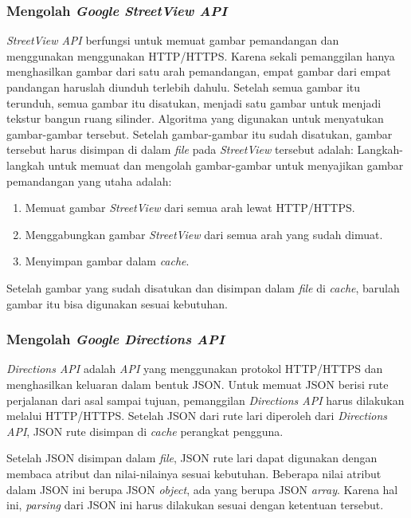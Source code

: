 \subsubsection{Mengolah \textit{Google StreetView API}} 
\textit{StreetView API} berfungsi untuk memuat gambar pemandangan dan menggunakan menggunakan HTTP/HTTPS. Karena sekali pemanggilan hanya menghasilkan gambar dari satu arah pemandangan, empat gambar dari empat pandangan haruslah diunduh terlebih dahulu. Setelah semua gambar itu terunduh, semua gambar itu disatukan, menjadi satu gambar untuk menjadi tekstur bangun ruang silinder. Algoritma yang digunakan untuk menyatukan gambar-gambar tersebut. Setelah gambar-gambar itu sudah disatukan, gambar tersebut harus disimpan di dalam \textit{file} pada \textit{StreetView} tersebut adalah: Langkah-langkah untuk memuat dan mengolah gambar-gambar untuk menyajikan gambar pemandangan yang utaha adalah:

	\begin{enumerate}
		\item Memuat gambar \textit{StreetView} dari semua arah lewat HTTP/HTTPS. 
		
		\item Menggabungkan gambar  \textit{StreetView} dari semua arah yang sudah dimuat.
		
		\item Menyimpan gambar dalam \textit{cache}.
	\end{enumerate}
	
Setelah gambar yang sudah disatukan dan disimpan dalam \textit{file} di \textit{cache}, barulah gambar itu bisa digunakan sesuai kebutuhan.


\subsubsection{Mengolah \textit{Google Directions API}}
\textit{Directions API} adalah \textit{API} yang menggunakan protokol HTTP/HTTPS dan menghasilkan keluaran dalam bentuk JSON. Untuk memuat JSON berisi rute perjalanan dari asal sampai tujuan, pemanggilan \textit{Directions API} harus dilakukan melalui HTTP/HTTPS. Setelah  JSON dari rute lari diperoleh dari \textit{Directions API}, JSON rute disimpan di \textit{cache} perangkat pengguna.

Setelah JSON disimpan dalam \textit{file}, JSON rute lari dapat digunakan dengan membaca atribut dan nilai-nilainya sesuai kebutuhan. Beberapa nilai atribut dalam JSON ini  berupa JSON \textit{object}, ada yang berupa JSON \textit{array}. Karena hal ini,  \textit{parsing} dari JSON ini harus dilakukan sesuai dengan ketentuan tersebut. 


%
%
%


